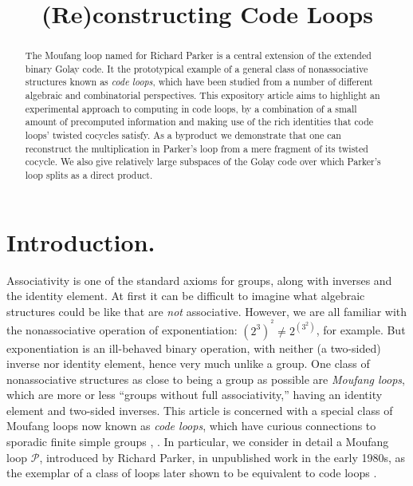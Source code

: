 \documentclass{article}
\theoremstyle{plain}
\theoremstyle{definition}
\def \cP {\mathcal{P}}
\begin{document}
\title{(Re)constructing Code Loops}
\author{%
}

\maketitle

\begin{abstract}
The Moufang loop named for Richard Parker is a central extension of the extended binary Golay code. 
It the prototypical example of a general class of nonassociative structures known as \emph{code loops}, which have been studied from a number of different algebraic and combinatorial perspectives.
This expository article aims to highlight an experimental approach to computing in code loops, by a combination of a small amount of precomputed information and making use of the rich identities that code loops' twisted cocycles satisfy.
As a byproduct we demonstrate that one can reconstruct the multiplication in Parker's loop from a mere fragment of its twisted cocycle. 
We also give relatively large subspaces of the Golay code over which Parker's loop splits as a direct product.
\end{abstract}


\section{Introduction.}

Associativity is one of the standard axioms for groups, along with inverses and the identity element.
At first it can be difficult to imagine what algebraic structures could be like that are \emph{not} associative. 
However, we are all familiar with the nonassociative operation of exponentiation:  $(2^3)^{\!{}^2} \neq 2^{(3^2)}$, for example.
But exponentiation is an ill-behaved binary operation, with neither (a two-sided) inverse nor identity element, hence very much unlike a group. 
One class of nonassociative structures as close to being a group as possible are \emph{Moufang loops}, which are more or less ``groups without full associativity,'' having an identity element and two-sided inverses.
This article is concerned with a special class of Moufang loops now known as \emph{code loops}, which have curious connections to sporadic finite simple groups \cite{Conway}, \cite[\S 7]{Griess87}.
In particular, we consider in detail a Moufang loop $\cP$, introduced by Richard Parker, in unpublished work in the early 1980s, as the exemplar of a class of loops later shown to be equivalent to code loops \cite{Griess}.
\end{document}
